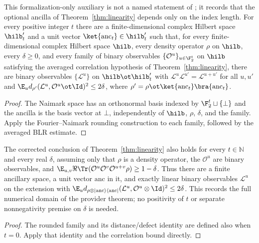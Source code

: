 \begin{lemma}
	\label{lem:linearity-common-ancilla}
	\leanok
	This formalization-only auxiliary is not a named statement of
	\cite{Natarajan2017Linearity}; it records that the optional ancilla of
	Theorem~\ref{thm:linearity} depends only on the index length. For every
	positive integer $t$ there are a finite-dimensional complex Hilbert space
	$\hilb'_t$ and a unit vector $\ket{\mathrm{anc}_t} \in \hilb'_t$ such that,
	for every finite-dimensional complex Hilbert space $\hilb$, every density
	operator $\rho$ on $\hilb$, every $\delta \ge 0$, and every family of binary
	observables $\{\mathcal{O}^u\}_{u \in \F_2^t}$ on $\hilb$ satisfying
	the averaged correlation hypothesis of Theorem~\ref{thm:linearity}, there
	are binary observables $\{\mathcal{L}^u\}$ on $\hilb \ot \hilb'_t$ with
	$\mathcal{L}^u\mathcal{L}^{u'}=\mathcal{L}^{u+u'}$ for all $u,u'$ and
	$\E_u d_{\rho'}(\mathcal{L}^u,\mathcal{O}^u\ot\Id)^2 \le 2\delta$,
	where $\rho'=\rho\ot\ket{\mathrm{anc}_t}\bra{\mathrm{anc}_t}$.
\end{lemma}
\begin{proof}
	\leanok
	The Naimark space has an orthonormal basis indexed by
	$\F_2^t\sqcup\{\bot\}$ and the ancilla is the basis vector at $\bot$,
	independently of $\hilb$, $\rho$, $\delta$, and the family. Apply the
	Fourier--Naimark rounding construction to each family, followed by the
	averaged BLR estimate.
\end{proof}

\begin{lemma}
	\label{lem:linearity-unrestricted-parameters}
	\leanok
	The corrected conclusion of Theorem~\ref{thm:linearity} also holds for
	every $t\in\mathbb N$ and every real $\delta$, assuming only that $\rho$
	is a density operator, the $\mathcal O^u$ are binary observables, and
	$\E_{u,v}\Re\Tr(\mathcal O^u\mathcal O^v\mathcal O^{u+v}\rho)
	\geq1-\delta$. Thus there are a finite ancillary space, a unit vector
	$\mathrm{anc}$ in it, and exactly linear binary observables $\mathcal L^u$
	on the extension with
	$\E_u d_{\rho\otimes|\mathrm{anc}\rangle\langle\mathrm{anc}|}
	(\mathcal L^u,\mathcal O^u\otimes\Id)^2\leq2\delta$.
	This records the full numerical domain of the provider theorem; no
	positivity of $t$ or separate nonnegativity premise on $\delta$ is needed.
\end{lemma}
\begin{proof}
	\leanok
	The rounded family and its distance/defect identity are defined also
	when $t=0$. Apply that identity and the correlation bound directly.
\end{proof}

